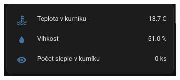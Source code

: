 \begin{figure}[H]
    \centering
    \includegraphics[width=0.8\textwidth]{img/homeasistant_temperature}
    \label{fig:homeasistant_temperature}
\end{figure}


%

%
